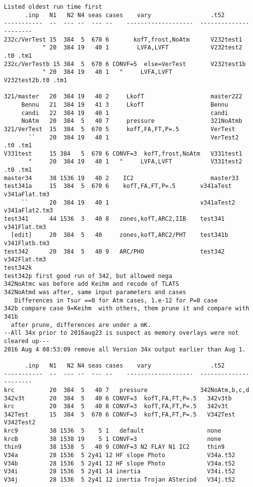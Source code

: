 \documentclass{article}
\begin{document}
\vspace{-3.mm} 
\begin{verbatim}
Listed oldest run time first
      .inp   N1   N2 N4 seas cases    vary                 .t52
-----------  --  --- --  --- --    -------------------  ----------------------    
232c/VerTest 15  384  5  670 6       kofT,frost,NoAtm      V232test1
           " 20  384 19   40 1        LVFA,LVFT            V232test2 .t0 .tm1
232c/VerTestb 15 384  5  670 6 CONVF=5  else=VerTest       V232test1b
           " 20  384 19   40 1   "     LVFA,LVFT           V232test2b.t0 .tm1

321/master   20  384 19   40 2     LkofT                   master222
     Bennu   21  384 19   41 3     LkofT                   Bennu
     candi   22  384 19   40 1                             candi 
     NoAtm   20  384  5   40 7     pressure                321NoAtmb
321/VerTest  15  384  5  670 5     kofT,FA,FT,P=.5         VerTest
       ``    20  384 19   40 1                             VerTest2  .t0 .tm1
V331test     15 384   5  670 6 CONVF=3  kofT,frost,NoAtm   V331test1
       "     20  384 19   40 1   "     LVFA,LVFT           V331test2 .t0 .tm1
master34     38 1536 19   40 2    IC2                      master33
test341a     15  384  5  670 6    kofT,FA,FT,P=.5       v341aTest   v341aFlat.tm3
     ``      20  384 19   40 1                          v341aTest2 v341aFlat2.tm3
test341      44 1536  3   40 8   zones,kofT,ARC2,IIB    test341      v341Flat.tm3
  [edit]     20  384  5   40     zones,kofT,ARC2/PHT    test341b    v341Flatb.tm3
test342      20  384  5   40 9   ARC/PHO                test342      v342Flat.tm3
test342k
test342p first good run of 342, but allowed nega
342NoAtmc was before add Keihm and recode of TLATS
342NoAtmd was after, same input parameters and cases
   Differences in Tsur ==0 for Atm cases, 1.e-12 for P=0 case
342b compare case 9=Keihm  with others, them prune it and compare with 341b
  after prune, differences are under a mK. 
--All 34x prior to 2016aug23 is suspect as memory overlays were not cleared up---
2016 Aug 4 08:53:09 remove all Version 34x output earlier than Aug 1.

      .inp   N1   N2 N4 seas cases    vary                 .t52
-----------  --  --- --  --- --    -------------------  ----------------------
krc          20  384  5   40 7   pressure               342NoAtm,b,c,d 
342v3t       20  384  5   40 6 CONVF=3  kofT,FA,FT,P=.5   342v3tb
krc          20  384  5   40 8 CONVF=3  kofT,FA,FT,P=.5   342v3t
342Test      15  384  5  670 6 CONVF=3  kofT,FA,FT,P=.5   V342Test  V342Test2
krc9         38 1536  5    5 1   default                  none
krcB         38 1538 19    5 1 CONVF=3                    none
thin9        38 1538  5   40 9 CONVF=3 N2 FLAY N1 IC2     thin9
V34a         28 1536  5 2y41 12 HF slope Photo            V34a.t52
V34b         28 1536  5 2y41 12 HF slope Photo            V34a.t52
V34i         28 1536  5 2y41 14 inertia                   V34i.t52 
V34j         28 1536  5 2y41 12 inertia Trojan ASteriod   V34j.t52  

\end{verbatim} 
\end{document}
